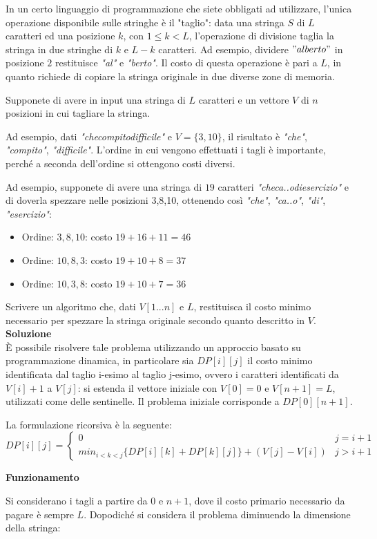 \documentclass[../cheatSheetAlgoritmi.tex]{subfiles}
\begin{document}
In un certo linguaggio di programmazione che siete obbligati ad utilizzare, l'unica operazione disponibile sulle stringhe è il "taglio": data una stringa $S$ di $L$ caratteri ed una posizione $k$, con $1 \leq k < L$, l'operazione di divisione taglia la stringa in due stringhe di $k$ e $L - k$ caratteri. Ad esempio, dividere $"alberto"$ in posizione $2$ restituisce \emph{"al"} e \emph{"berto"}. 
Il costo di questa operazione è pari a $L$, in quanto richiede di copiare la stringa originale in due diverse zone di memoria. 

Supponete di avere in input una stringa di $L$ caratteri e un vettore $V$ di $n$ posizioni in cui tagliare la stringa.  

Ad esempio, dati \emph{"checompitodifficile"} e $V=\{3,10\}$, il risultato è \emph{"che"}, \emph{"compito"}, \emph{"difficile"}. L'ordine in cui vengono effettuati i tagli è importante, perché a seconda dell'ordine si ottengono costi diversi.  

Ad esempio, supponete di avere una stringa di $19$ caratteri \emph{"checa..odiesercizio"} e di doverla spezzare nelle posizioni 3,8,10, ottenendo così \emph{"che"}, \emph{"ca..o"}, \emph{"di"}, \emph{"esercizio"}:
\begin{itemize}
	\item Ordine: $3, 8, 10$: costo $19 + 16 + 11 = 46$
	\item Ordine: $10, 8, 3$: costo $19 + 10 + 8 = 37$
	\item Ordine: $10, 3, 8$: costo $19 + 10 + 7 = 36$
\end{itemize}
Scrivere un algoritmo che, dati $V[1. . . n]$ e $L$, restituisca il costo minimo necessario per spezzare la stringa originale secondo quanto descritto in $V$. \\
\textbf{Soluzione} \\
È possibile risolvere tale problema utilizzando un approccio basato su programmazione dinamica, in particolare sia $DP[i][j]$ il costo minimo identificata dal taglio i-esimo al taglio j-esimo, ovvero i caratteri identificati da $V[i] + 1$ a $V[j]$: si estenda il vettore iniziale con $V[0] = 0$ e $V[n + 1] = L$, utilizzati come delle sentinelle. Il problema iniziale corrisponde a $DP[0][n + 1]$. 

La formulazione ricorsiva è la seguente: 
\begin{equation*}
  	DP[i][j] =\begin{cases}
  		0 & \text{$j = i + 1$} \\
    	min_{i < k < j}\{DP[i][k] + DP[k][j]\} + (V[j] - V[i]) & \text{$j > i + 1$}
  	\end{cases}
\end{equation*}
\begin{flushleft}
\textbf{Funzionamento}
\end{flushleft}
Si considerano i tagli a partire da $0$ e $n + 1$, dove il costo primario necessario da pagare è sempre $L$. Dopodiché si considera il problema diminuendo la dimensione della stringa: 
\end{document}
